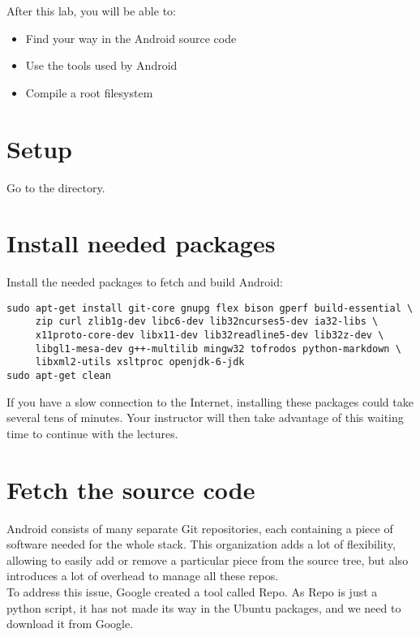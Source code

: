 
After this lab, you will be able to:
\begin{itemize}
  \item Find your way in the Android source code
  \item Use the tools used by Android
  \item Compile a root filesystem
\end{itemize}

\section{Setup}

Go to the  directory.

\section{Install needed packages}

Install the needed packages to fetch and build Android:

\begin{verbatim}
sudo apt-get install git-core gnupg flex bison gperf build-essential \
     zip curl zlib1g-dev libc6-dev lib32ncurses5-dev ia32-libs \
     x11proto-core-dev libx11-dev lib32readline5-dev lib32z-dev \
     libgl1-mesa-dev g++-multilib mingw32 tofrodos python-markdown \
     libxml2-utils xsltproc openjdk-6-jdk
sudo apt-get clean
\end{verbatim}

If you have a slow connection to the Internet, installing these packages
could take several tens of minutes. Your instructor will then take advantage
of this waiting time to continue with the lectures. 

\section{Fetch the source code}

Android consists of many separate Git repositories, each containing a piece
of software needed for the whole stack. This organization adds a lot of
flexibility, allowing to easily add or remove a particular piece from the source
tree, but also introduces a lot of overhead to manage all these repos.\\

To address this issue, Google created a tool called Repo. As Repo is just a
python script, it has not made its way in the Ubuntu packages, and we need to
download it from Google.\\

